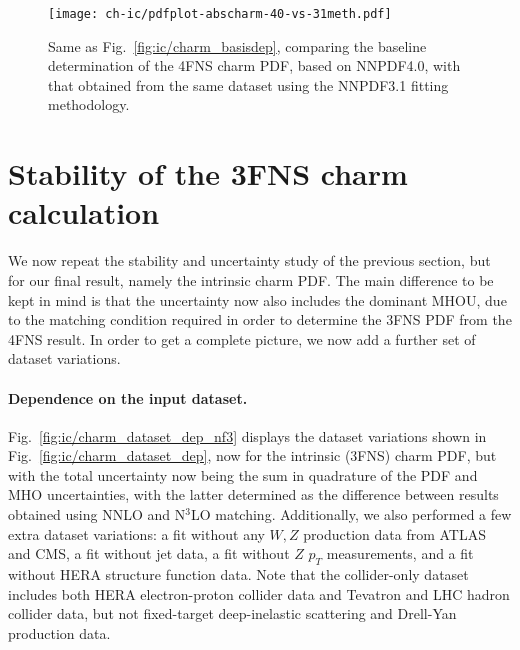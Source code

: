 \begin{figure}[t]
  \begin{center}
    \texttt{[image: ch-ic/pdfplot-abscharm-40-vs-31meth.pdf]}
    \caption{\small Same as Fig.~\ref{fig:ic/charm_basisdep}, comparing
      the baseline determination of the 4FNS charm PDF, based
      on NNPDF4.0, with that obtained
      from the same dataset using the NNPDF3.1 fitting methodology.
  \label{fig:ic/pdfplot-abscharm-40-vs-31meth} }
\end{center}
\end{figure}




\section{Stability of the 3FNS charm calculation}
\label{app:ic/charm_stability_3fns}

We now repeat the stability and uncertainty
study of the previous section, but for our final
result, namely the intrinsic charm PDF. The main difference to be kept
in mind is that the uncertainty now also includes the dominant MHOU,
due to the matching condition required in order to determine the 3FNS
PDF from the 4FNS result. In order to get a complete picture, we now
add a further set of dataset variations.

\paragraph{Dependence on the input dataset.}
%
Fig.~\ref{fig:ic/charm_dataset_dep_nf3} displays the dataset variations shown in
Fig.~\ref{fig:ic/charm_dataset_dep}, now for the intrinsic (3FNS) charm
PDF, but with the total uncertainty now being the sum in quadrature of
the PDF and MHO uncertainties, with the latter determined as the difference between
results obtained using NNLO and N$^3$LO matching.
%
Additionally, we also performed a few extra  dataset
variations: a fit without any $W, Z$ production data from ATLAS and CMS,
a fit without jet data, a fit without $Z$ $p_T$ measurements, and a fit without
HERA structure function data.
%
Note that the collider-only dataset includes both HERA electron-proton
collider data and Tevatron and LHC hadron collider data, but not
fixed-target deep-inelastic scattering and Drell-Yan production data.


